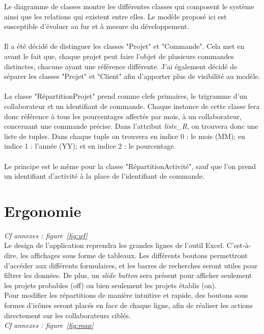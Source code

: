 \documentclass[french]{report}
\begin{document}
   Le diagramme de classes montre les différentes classes qui composent le système
 ainsi que les relations qui existent entre elles. Le modèle proposé ici est
 susceptible d’évoluer au fur et à mesure du développement.\\\\ Il a été décidé
 de distinguer les classes "Projet" et "Commande". Cela met en avant le fait
 que, chaque projet peut faire l’objet de plusieurs commandes distinctes,
 chacune ayant une référence différente. J'ai également décidé de séparer les
 classes "Projet" et "Client" afin d’apporter plus de visibilité au modèle.\\\\
 La classe "RépartitionProjet" prend comme clefs primaires, le trigramme d’un
 collaborateur et un identifiant de commande. Chaque instance de cette classe
 fera donc référence à tous les pourcentages affectés par mois, à un
 collaborateur, concernant une commande précise. Dans l'attribut \emph{liste\_R},
 on trouvera donc une liste de tuples. Dans chaque tuple on trouvera en indice 0 :
 le mois (MM); en indice 1 : l'année (YY); et en indice 2 : le pourcentage. \\\\
 Le principe est le même pour la classe "RépartitionActivité", sauf que l’on
 prend un identifiant d’activité à la place de l’identifiant de commande.

  \section{Ergonomie}

  \emph{Cf annexes : figure~\ref{fig:wf}}\\

  Le design de l’application reprendra les grandes lignes de l’outil Excel.
  C’est-à-dire, les affichages sous forme de tableaux. Les différents boutons
  permettront d’accéder aux différents formulaires, et les barres de recherches
  seront utiles pour filtrer les données. De plus, un \emph{slide button} sera
  présent pour afficher seulement les projets probables (off) ou bien seulement
  les projets établis (on).\\ Pour modifier les répartitions de manière intuitive
  et rapide, des boutons sous formes d’icônes seront placés en face de chaque
  ligne, afin de réaliser les actions directement sur les collaborateurs ciblés.\\


  \emph{Cf annexes : figure~\ref{fig:map}}\\
\end{document}

